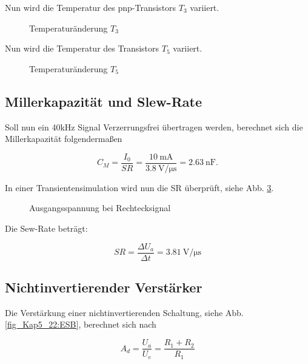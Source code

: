 Nun wird die Temperatur des pnp-Transistors $T_3$ variiert.

\begin{figure}[H]
	\centering \small
	\scalebox{0.9}{}
	\caption{Temperaturänderung $T_3$}
	\label{fig_Kap5_21:SR}
\end{figure}

Nun wird die Temperatur des Transistors $T_5$ variiert.

\begin{figure}[H]
	\centering \small
	\scalebox{0.9}{}
	\caption{Temperaturänderung $T_5$}
	\label{fig_Kap5_21:SR}
\end{figure}

\subsection{Millerkapazität und Slew-Rate}
Soll nun ein 40kHz Signal Verzerrungsfrei übertragen werden, berechnet sich die Millerkapazität folgendermaßen

\begin{equation}
    C_M = \frac{I_0}{SR} = \frac{\SI{10}{\milli\ampere}}{\SI{3,8}{\volt\per\micro\second}} = \SI{2.63}{\nano\farad} .
\end{equation}

In einer Transientensimulation wird nun die SR überprüft, siehe Abb. \ref{fig_Kap5_21:SR}.

\begin{figure}[H]
	\centering \small
	\scalebox{0.9}{}
	\caption{Ausgangsspannung bei Rechtecksignal}
	\label{fig_Kap5_21:SR}
\end{figure}

Die Sew-Rate beträgt:

\begin{equation}
    SR = \frac{\Delta U_a}{\Delta t} = \SI{3.81}{\volt\per\micro\second}
\end{equation}

\subsection{Nichtinvertierender Verstärker}
Die Verstärkung einer nichtinvertierenden Schaltung, siehe Abb. \ref{fig_Kap5_22:ESB}, berechnet sich nach

\begin{equation}
    A_d = \frac{U_a}{U_e} = \frac{R_1+R_2}{R_1}
\end{equation}

